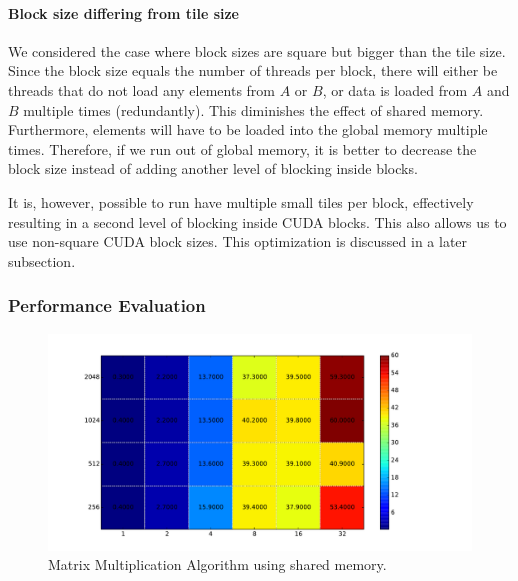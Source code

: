 \documentclass[12pt]{article}
\begin{document}
\paragraph{Block size differing from tile size}
We considered the case where block sizes are square but bigger than the tile size. Since the block size equals the number of threads per block, there will either be threads that do not load any elements from $A$ or $B$, or data is loaded from $A$ and $B$ multiple times (redundantly).  This diminishes the effect of shared memory. Furthermore, elements will have to be loaded into the global memory multiple times. Therefore, if we run out of global memory, it is better to decrease the block size instead of adding another level of blocking inside blocks. 

It is, however, possible to run have multiple small tiles per block, effectively resulting in a second level of blocking inside CUDA blocks. This also allows us to use non-square CUDA block sizes. This optimization is discussed in a later subsection.

\subsubsection{Performance Evaluation}
\begin{figure}[H]
\includegraphics[width=\textwidth]{blocked_heat_scaled.pdf}
\caption{Matrix Multiplication Algorithm using shared memory.}
\label{fig:blocked_performance}
\end{figure}
\end{document}

